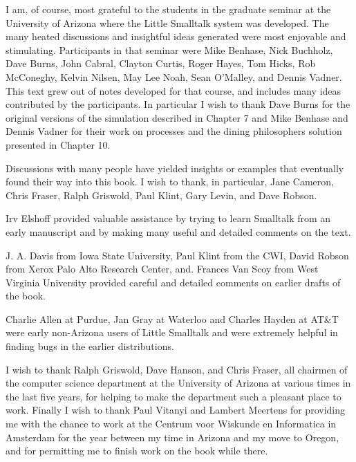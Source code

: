 \clearpage
{}





I am, of course, most grateful to the students in the graduate seminar at
the University of Arizona where the Little Smalltalk system was developed.
The many heated discussions and insightful ideas generated were most
enjoyable and stimulating. Participants in that seminar were Mike Benhase, Nick Buchholz, Dave Burns, John Cabral, Clayton Curtis, Roger
Hayes, Tom Hicks, Rob McConeghy, Kelvin Nilsen, May Lee Noah, Sean
O'Malley, and Dennis Vadner. This text grew out of notes developed for
that course, and includes many ideas contributed by the participants. In
particular I wish to thank Dave Burns for the original versions of the
simulation described in Chapter 7 and Mike Benhase and Dennis Vadner
for their work on processes and the dining philosophers solution presented
in Chapter 10.

Discussions with many people have yielded insights or examples that
eventually found their way into this book. I wish to thank, in particular,
Jane Cameron, Chris Fraser, Ralph Griswold, Paul Klint, Gary Levin, and
Dave Robson.

Irv Elshoff provided valuable assistance by trying to learn Smalltalk
from an early manuscript and by making many useful and detailed comments on the text.

J. A. Davis from Iowa State University, Paul Klint from the CWI, David
Robson from Xerox Palo Alto Research Center, and. Frances Van Scoy
from West Virginia University provided careful and detailed comments on
earlier drafts of the book.

Charlie Allen at Purdue, Jan Gray at Waterloo and Charles Hayden at
AT\&T were early non-Arizona users of Little Smalltalk and were extremely
helpful in finding bugs in the earlier distributions.

I wish to thank Ralph Griswold, Dave Hanson, and Chris Fraser, all
chairmen of the computer science department at the University of Arizona
at various times in the last five years, for helping to make the department
such a pleasant place to work. Finally I wish to thank Paul Vitanyi and
Lambert Meertens for providing me with the chance to work at the Centrum voor Wiskunde en Informatica in Amsterdam for the year between
my time in Arizona and my move to Oregon, and for permitting me to
finish work on the book while there.


